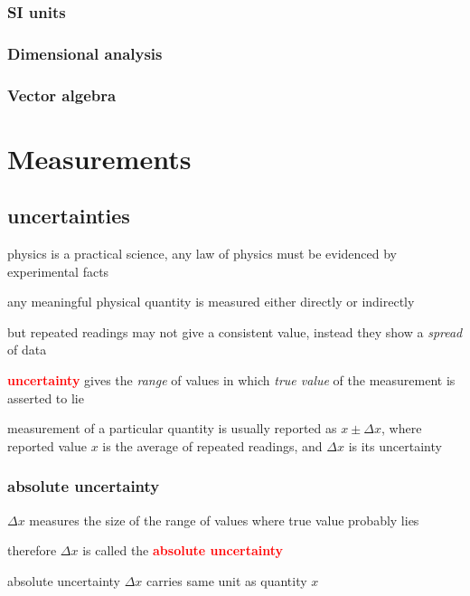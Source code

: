 \documentclass[a4paper,12pt]{book}
\newcommand{\cmt}{}
\newcommand{\keypoint}[1]{\textbf{\textcolor{red}{#1}}}
\newcommand{\keypoint}[1]{\textbf{\textcolor{red}{#1}}}
\newcommand{\cmt}{}
\begin{document}
\label{ex:comp-of-W}

	
\subsection*{SI units}

\subsection*{Dimensional analysis}

\subsection*{Vector algebra}

\cleardoublepage

\chapter{Measurements}

\section{uncertainties}

physics is a practical science, any law of physics must be evidenced by experimental facts

any meaningful physical quantity is measured either directly or indirectly

but repeated readings may not give a consistent value, instead they show a \emph{spread} of data

\keypoint{uncertainty} gives the \emph{range} of values in which \emph{true value} of the measurement is asserted to lie

measurement of a particular quantity is usually reported as $x \pm \Delta x$, where reported value $x$ is the average of repeated readings, and $\Delta x$ is its uncertainty

\subsection{absolute uncertainty}

$\Delta x$ measures the size of the range of values where true value probably lies

therefore $\Delta x$ is called the \keypoint{absolute uncertainty}

\cmt absolute uncertainty $\Delta x$ carries same unit as quantity $x$
\end{document}
